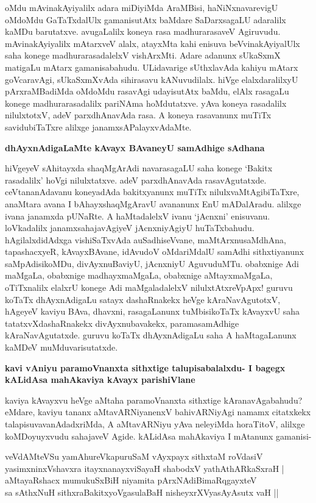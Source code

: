 oMdu mAvinakAyiyalilx adara miDiyiMda AraMBisi, haNiNxnavarevigU oMdoMdu GaTaTxdalUlx gamanisutAtx baMdare SaDarxsagaLU adaralilx kaMDu barutatxve. avugaLalilx koneya rasa madhurarasaveV Agiruvudu. mAvinakAyiyalilx mAtarxveV alalx, atayxMta kahi enisuva beVvinakAyiyalUlx saha konege madhurarasadalelxV vishArxMti. Adare adanunx sUkaSxmX matigaLu mAtarx gamanisabahudu. ULidavarige sUthxlavAda kahiyu mAtarx goVcaravAgi, sUkaSxmXvAda sihirasavu kANuvudilalx. hiVge elalxdaralilxyU pArxraMBadiMda oMdoMdu rasavAgi udayisutAtx baMdu, elAlx rasagaLu konege madhurarasadalilx pariNAma hoMdutatxve. yAva koneya rasadalilx nilulxtotxV, adeV parxdhAnavAda rasa. A koneya rasavanunx muTiTx savidubiTaTxre alilxge janamxsAPalayxvAdaMte.

\noindent
{\bf\large{dhAyxnAdigaLaMte kAvayx BAvaneyU samAdhige sAdhana}}\label{231}

hiVgeyeV sAhitayxda shaqMgArAdi navarasagaLU saha konege `Bakitx rasadalilx' hoVgi nilulxtatxve. adeV parxdhAnavAda rasavAgutatxde. ceVtananAdavanu koneyadAda bakitxyanunx muTiTx nilulxvaMtAgibiTaTxre, anaMtara avana I bAhayxshaqMgAravU avananunx EnU mADalAradu. alilxge ivana janamxda pUNaRte. A haMtadalelxV ivanu `jAcnxni' enisuvanu. loVkadalilx janamxsahajavAgiyeV jAcnxniyAgiyU huTaTxbahudu. hAgilalxdidAdxga vishiSaTxvAda auSadhiseVvane, maMtArxnusaMdhAna, tapashacxyeR, kAvayxBAvane, idAvudoV oMdariMdalU samAdhi sithxtiyanunx saMpAdisikoMDu, divAyxnuBaviyU, jAcnxniyU AguvuduMTu. obabxnige Adi maMgaLa, obabxnige madhayxmaMgaLa, obabxnige aMtayxmaMgaLa, oTiTxnalilx elalxrU konege Adi maMgaladalelxV nilulxtAtxreVpApx! guruvu koTaTx dhAyxnAdigaLu satayx dashaRnakekx heVge kAraNavAgutotxV, hAgeyeV kaviyu BAva, dhavxni, rasagaLanunx tuMbisikoTaTx kAvayxvU saha tatatxvXdashaRnakekx divAyxnubavakekx, paramasamAdhige kAraNavAgutatxde. guruvu koTaTx dhAyxnAdigaLu saha A haMtagaLanunx kaMDeV muMduvarisutatxde.

\noindent
{\bf\large{kavi vAniyu paramoVnanxta sithxtige talupisabalalxdu- I bagegx kALidAsa mahAkaviya kAvayx parishiVlane}}\label{page232}

kaviya kAvayxvu heVge aMtaha paramoVnanxta sithxtige kAranavAgabahudu? eMdare, kaviyu tananx aMtavARNiyanenxV bahivARNiyAgi namamx citatxkekx talapisuvavanAdadxriMda, A aMtavARNiyu yAva neleyiMda horaTitoV, alilxge koMDoyuyxvudu sahajaveV Agide. kALidAsa mahAkaviya I mAtanunx gamanisi-

\begin{shloka}
veVdAMteVSu yamAhureVkapuruSaM vAyxpayx sithxtaM roVdasiV\\\label{232}
yasimxninxVshavxra itayxnanayxviSayaH shabodxV yathAthARkaSxraH |\\
aMtayaRshacx mumukuSxBiH niyamita pArxNAdiBimaRqgayxteV \\
sa sAthxNuH sithxraBakitxyoVgasulaBaH nisheyxrXVyasAyAsutx vaH ||
\end{shloka}

